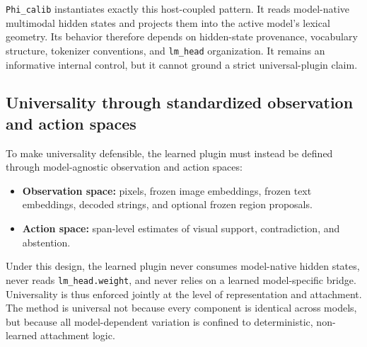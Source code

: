 \texttt{Phi\_calib} instantiates exactly this host-coupled pattern. It reads model-native multimodal hidden states and projects them into the active model's lexical geometry. Its behavior therefore depends on hidden-state provenance, vocabulary structure, tokenizer conventions, and \texttt{lm\_head} organization. It remains an informative internal control, but it cannot ground a strict universal-plugin claim.

\subsection{Universality through standardized observation and action spaces}

To make universality defensible, the learned plugin must instead be defined through model-agnostic observation and action spaces:
\begin{itemize}
  \item \textbf{Observation space:} pixels, frozen image embeddings, frozen text embeddings, decoded strings, and optional frozen region proposals.
  \item \textbf{Action space:} span-level estimates of visual support, contradiction, and abstention.
\end{itemize}

Under this design, the learned plugin never consumes model-native hidden states, never reads \texttt{lm\_head.weight}, and never relies on a learned model-specific bridge. Universality is thus enforced jointly at the level of representation and attachment. The method is universal not because every component is identical across models, but because all model-dependent variation is confined to deterministic, non-learned attachment logic.

